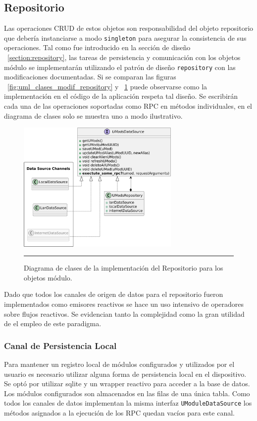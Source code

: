 \subsection{Repositorio}
Las operaciones CRUD de estos objetos son responsabilidad del objeto repositorio que debería instanciarse a modo \texttt{singleton} para asegurar la consistencia de sus operaciones. Tal como fue introducido en la sección de diseño ~\ref{section:repository}, las tareas de persistencia y comunicación con los objetos módulo se implementarán utilizando el patrón de diseño \texttt{repository} con las modificaciones documentadas. Si se comparan las figuras ~\ref{fig:uml_clases_modif_repository} y ~\ref{fig:class_umods_repository} puede observarse como la implementación en el código de la aplicación respeta tal diseño. Se escribirán cada una de las operaciones soportadas como RPC en métodos individuales, en el diagrama de clases solo se muestra uno a modo ilustrativo.

\begin{figure}[htbp]
	\centering
	\includegraphics[width=0.7\textwidth]{Figures/iter1/CLASS_umods_repository_ink.png}
	\rule{35em}{1pt}
	\caption[Class Diagram]{Diagrama de clases de la implementación del Repositorio para los objetos módulo.}
	\label{fig:class_umods_repository}
\end{figure}

Dado que todos los canales de origen de datos para el repositorio fueron implementados como emisores reactivos se hace un uso intensivo de operadores sobre flujos reactivos. Se evidencian tanto la complejidad como la gran utilidad de el empleo de este paradigma.

\subsubsection{Canal de Persistencia Local}
Para mantener un registro local de módulos configurados y utilizados por el usuario es necesario utilizar alguna forma de persistencia local en el dispositivo. Se optó por utilizar sqlite y un wrapper reactivo para acceder a la base de datos. Los módulos configurados son almacenados en las filas de una única tabla. Como todos los canales de datos implementan la misma interfaz \texttt{UModuleDataSource} los métodos asignados a la ejecución de los RPC quedan vacíos para este canal. 

